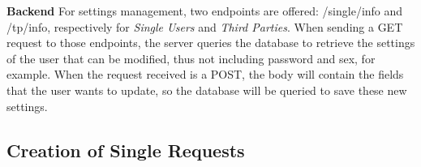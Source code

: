 \documentclass[titlepage]{article}
\begin{document}
	\newline
	\newline
	\noindent
	{\bf Backend} \newline
	For settings management, two endpoints are offered: /single/info and /tp/info, respectively for {\it Single Users} and {\it Third Parties}. When sending a GET request to those endpoints, the server queries the database to retrieve the settings of the user that can be modified, thus not including password and sex, for example. When the request received is a POST, the body will contain the fields that the user wants to update, so the database will be queried to save these new settings.
	
	
	\subsection{Creation of Single Requests}
\end{document}

